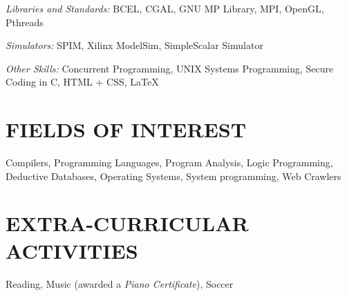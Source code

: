 \documentclass[margin]{res}
\begin{document}
\begin{resume}
        {\sl Libraries and Standards:}
        BCEL, CGAL, GNU MP Library, MPI, OpenGL, Pthreads

        {\sl Simulators:}
        SPIM, Xilinx ModelSim, SimpleScalar Simulator

        {\sl Other Skills:}
        Concurrent Programming, UNIX Systems Programming, Secure Coding in C, HTML + CSS, \LaTeX

\section{FIELDS OF INTEREST} Compilers, Programming Languages, Program Analysis, Logic Programming, \\ 
Deductive Databases, Operating Systems, System programming, Web Crawlers

\section{EXTRA-CURRICULAR \\ ACTIVITIES}             
Reading, Music (awarded a {\it Piano Certificate}), Soccer

\end{resume}
\end{document}
